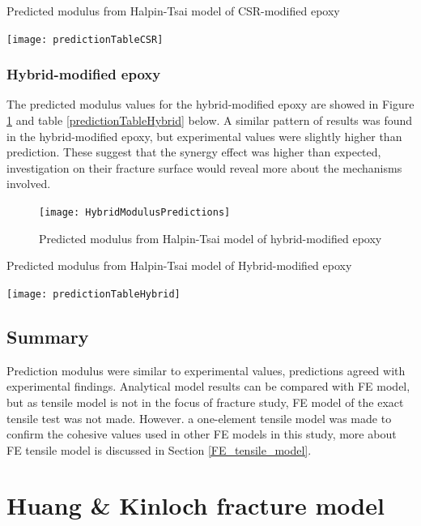 \documentclass[numbers=noendperiod,chapterprefix=on]{icldt} %
\begin{document}
\begin{table}[!htpb]
\centering
\caption{Predicted modulus from Halpin-Tsai model of CSR-modified epoxy } \label{predictionTableCSR}
\texttt{[image: predictionTableCSR]}
\end{table}
\FloatBarrier

\subsubsection{Hybrid-modified epoxy}

The predicted modulus values for the hybrid-modified epoxy are showed in Figure \ref{HybridModulusPredictions} and table \ref{predictionTableHybrid} below. A similar pattern of results was found in the hybrid-modified epoxy, but experimental values were slightly higher than prediction. These suggest that the synergy effect was higher than expected, investigation on their fracture surface would reveal more about the mechanisms involved. 

\begin{figure}[!htpb]
\centering
\texttt{[image: HybridModulusPredictions]}
\caption{Predicted modulus from Halpin-Tsai model of hybrid-modified epoxy}\label{HybridModulusPredictions}
\end{figure}
\FloatBarrier

\begin{table}[!htpb]
\centering
\caption{Predicted modulus from Halpin-Tsai model of Hybrid-modified epoxy } \label{predictionTableHybrid}
\texttt{[image: predictionTableHybrid]}
\end{table}
\FloatBarrier

\subsection{Summary}
Prediction modulus were similar to experimental values, predictions agreed with experimental findings. Analytical model results can be compared with FE model, but as tensile model is not in the focus of fracture study, FE model of the exact tensile test was not made. However. a one-element tensile model was made to confirm the cohesive values used in other FE models in this study, more about FE tensile model is discussed in Section \ref{FE_tensile_model}.  

\section{Huang \& Kinloch fracture model}
\end{document}
